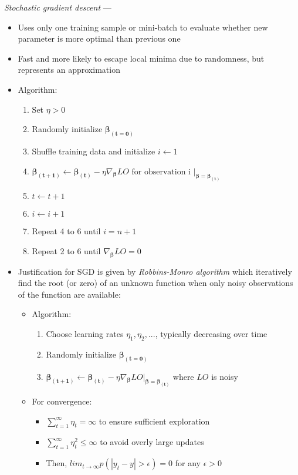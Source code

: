 \emph{Stochastic gradient descent} ---
\begin{itemize}
    \item Uses only one training sample or mini-batch to evaluate whether new parameter is more optimal than previous one
    \item Fast and more likely to escape local minima due to randomness, but represents an approximation  
    \item Algorithm: 
    \begin{enumerate}
        \item Set $\eta > 0$
        \item Randomly initialize $\boldsymbol{\beta_{(t=0)}}$
        \item Shuffle training data and initialize $i \leftarrow 1$
        \item $\boldsymbol{\beta_{(t+1)}} \leftarrow \boldsymbol{\beta_{(t)}} - \eta \nabla_{\boldsymbol{\beta}} LO \textrm{ for observation i } |_{\boldsymbol{\beta} = \boldsymbol{\beta_{(t)}}}$
        \item $t \leftarrow t+1$
        \item $i \leftarrow i+1$
        \item Repeat 4 to 6 until $i = n+1$
        \item Repeat 2 to 6 until $\nabla_{\boldsymbol{\beta}} LO = 0$
    \end{enumerate}
    \item Justification for SGD is given by \emph{Robbins-Monro algorithm} which iteratively find the root (or zero) of an unknown function when only noisy observations of the function are available:
    \begin{itemize}
        \item Algorithm:
        \begin{enumerate}
            \item Choose learning rates $\eta_1, \eta_2, ...$, typically decreasing over time
            \item Randomly initialize $\boldsymbol{\beta_{(t=0)}}$
            \item $\boldsymbol{\beta_{(t+1)}} \leftarrow \boldsymbol{\beta_{(t)}} - \eta \nabla_{\boldsymbol{\beta}} LO|_{\boldsymbol{\beta} = \boldsymbol{\beta_{(t)}}}$ where $LO$ is noisy
        \end{enumerate}
        \item For convergence:
        \begin{itemize}
            \item $\sum_{t=1}^\infty \eta_t = \infty$ to ensure sufficient exploration
            \item $\sum_{t=1}^\infty \eta_t^2 \leq \infty$ to avoid overly large updates
            \item Then, $lim_{t \rightarrow \infty} p( | y_t - y | > \epsilon ) = 0$ for any $\epsilon > 0$
        \end{itemize}
    \end{itemize}
\end{itemize}

